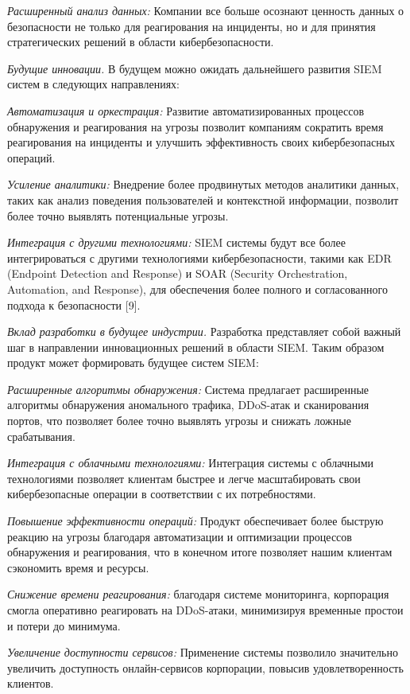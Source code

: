 \begin{multicols}{2}
\emph{Расширенный анализ данных:} Компании все больше осознают ценность
данных о безопасности не только для реагирования на инциденты, но и для
принятия стратегических решений в области кибербезопасности.

\emph{Будущие инновации.} В будущем можно ожидать дальнейшего развития
SIEM систем в следующих направлениях:

\emph{Автоматизация и оркестрация:} Развитие автоматизированных
процессов обнаружения и реагирования на угрозы позволит компаниям
сократить время реагирования на инциденты и улучшить эффективность своих
кибербезопасных операций.

\emph{Усиление аналитики:} Внедрение более продвинутых методов аналитики
данных, таких как анализ поведения пользователей и контекстной
информации, позволит более точно выявлять потенциальные угрозы.

\emph{Интеграция с другими технологиями:} SIEM системы будут все более
интегрироваться с другими технологиями кибербезопасности, такими как EDR
(Endpoint Detection and Response) и SOAR (Security Orchestration,
Automation, and Response), для обеспечения более полного и
согласованного подхода к безопасности {[}9{]}.

\emph{Вклад разработки в будущее индустрии.} Разработка представляет
собой важный шаг в направлении инновационных решений в области SIEM.
Таким образом продукт может формировать будущее систем SIEM:

\emph{Расширенные алгоритмы обнаружения:} Система предлагает расширенные
алгоритмы обнаружения аномального трафика, DDoS-атак и сканирования
портов, что позволяет более точно выявлять угрозы и снижать ложные
срабатывания.

\emph{Интеграция с облачными технологиями:} Интеграция системы с
облачными технологиями позволяет клиентам быстрее и легче масштабировать
свои кибербезопасные операции в соответствии с их потребностями.

\emph{Повышение эффективности операций:} Продукт обеспечивает более
быструю реакцию на угрозы благодаря автоматизации и оптимизации
процессов обнаружения и реагирования, что в конечном итоге позволяет
нашим клиентам сэкономить время и ресурсы.

\emph{Снижение времени реагирования:} благодаря системе мониторинга,
корпорация смогла оперативно реагировать на DDoS-атаки, минимизируя
временные простои и потери до минимума.

\emph{Увеличение доступности сервисов:} Применение системы позволило
значительно увеличить доступность онлайн-сервисов корпорации, повысив
удовлетворенность клиентов.


\end{multicols}
